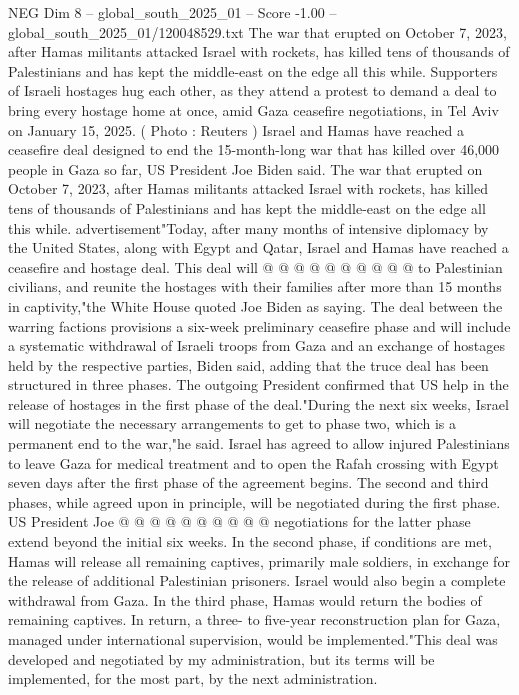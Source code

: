 \begin{textsample}{NEG Dim 8 – global\_south\_2025\_01 – Score -1.00 – global\_south\_2025\_01/120048529.txt}  \label{ex:f8_neg_331}
The war that erupted on October 7, 2023, after Hamas militants attacked Israel with rockets, has killed tens of thousands of Palestinians and has kept the middle-east on the edge all this while.
Supporters of Israeli hostages hug each other, as they attend a protest to demand a deal to bring every hostage home at once, amid Gaza ceasefire negotiations, in Tel Aviv on January 15, 2025. ( Photo : Reuters ) Israel and Hamas have reached a ceasefire deal designed to end the 15-month-long war that has killed over 46,000 people in Gaza so far, US President Joe Biden said.
The war that erupted on October 7, 2023, after Hamas militants attacked Israel with rockets, has killed tens of thousands of Palestinians and has kept the middle-east on the edge all this while. advertisement"Today, after many months of intensive diplomacy by the United States, along with Egypt and Qatar, Israel and Hamas have reached a ceasefire and hostage deal.
This deal will @ @ @ @ @ @ @ @ @ @ to Palestinian civilians, and reunite the hostages with their families after more than 15 months in captivity,"the White House quoted Joe Biden as saying.
The deal between the warring factions provisions a six-week preliminary ceasefire phase and will include a systematic withdrawal of Israeli troops from Gaza and an exchange of hostages held by the respective parties, Biden said, adding that the truce deal has been structured in three phases.
The outgoing President confirmed that US help in the release of hostages in the first phase of the deal."During the next six weeks, Israel will negotiate the necessary arrangements to get to phase two, which is a permanent end to the war,"he said.
Israel has agreed to allow injured Palestinians to leave Gaza for medical treatment and to open the Rafah crossing with Egypt seven days after the first phase of the agreement begins.
The second and third phases, while agreed upon in principle, will be negotiated during the first phase.
US President Joe @ @ @ @ @ @ @ @ @ @ negotiations for the latter phase extend beyond the initial six weeks.
In the second phase, if conditions are met, Hamas will release all remaining captives, primarily male soldiers, in exchange for the release of additional Palestinian prisoners.
Israel would also begin a complete withdrawal from Gaza.
In the third phase, Hamas would return the bodies of remaining captives.
In return, a three- to five-year reconstruction plan for Gaza, managed under international supervision, would be implemented."This deal was developed and negotiated by my administration, but its terms will be implemented, for the most part, by the next administration.

\end{textsample}
